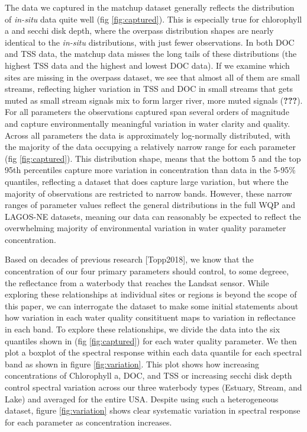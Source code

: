 \documentclass[]{article}
\begin{document}
The data we captured in the matchup dataset generally reflects the
distribution of \emph{in-situ} data quite well (fig \ref{fig:captured}).
This is especially true for chlorophyll a and secchi disk depth, where
the overpass distribution shapes are nearly identical to the
\emph{in-situ} distributions, with just fewer observations. In both DOC
and TSS data, the matchup data misses the long tails of these
distributions (the highest TSS data and the highest and lowest DOC
data). If we examine which sites are missing in the overpass dataset, we
see that almost all of them are small streams, reflecting higher
variation in TSS and DOC in small streams that gets muted as small
stream signals mix to form larger river, more muted signals
({\textbf{???}}). For all parameters the observations captured span
several orders of magnitude and capture environmentally meaningful
variation in water clarity and quality. Across all parameters the data
is approximately log-normally distributed, with the majority of the data
occupying a relatively narrow range for each parameter (fig
\ref{fig:captured}). This distribution shape, means that the bottom 5
and the top 95th percentiles capture more variation in concentration
than data in the 5-95\% quantiles, reflecting a dataset that does
capture large variation, but where the majority of observations are
restricted to narrow bands. However, these narrow ranges of parameter
values reflect the general distributions in the full WQP and LAGOS-NE
datasets, meaning our data can reasonably be expected to reflect the
overwhelming majority of environmental variation in water quality
parameter concentration.

Based on decades of previous research {[}Topp2018{]}, we know that the
concentration of our four primary parameters should control, to some
degreee, the reflectance from a waterbody that reaches the Landsat
sensor. While exploring these relationships at individual sites or
regions is beyond the scope of this paper, we can interrogate the
dataset to make some initial statements about how variation in each
water quality consitituent maps to variation in reflectance in each
band. To explore these relationships, we divide the data into the six
quantiles shown in (fig \ref{fig:captured}) for each water quality
parameter. We then plot a boxplot of the spectral response within each
data quantile for each spectral band as shown in figure
\ref{fig:variation}. This plot shows how increasing concentrations of
Chlorophyll a, DOC, and TSS or increasing secchi disk depth control
spectral variation across our three waterbody types (Estuary, Stream,
and Lake) and averaged for the entire USA. Despite using such a
heterogeneous dataset, figure \ref{fig:variation} shows clear systematic
variation in spectral response for each parameter as concentration
increases.
\end{document}
